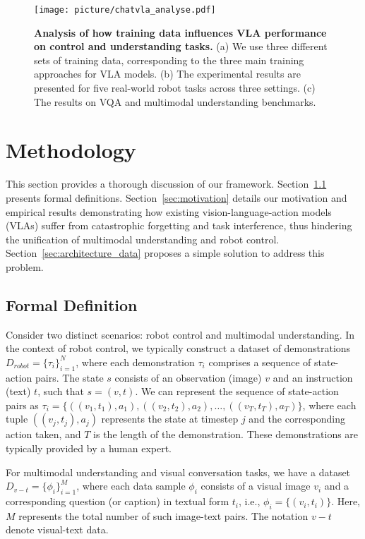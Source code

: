 \begin{figure*}[t]
    \centering
    \texttt{[image: picture/chatvla\_analyse.pdf]}
    \caption{\textbf{Analysis of how training data influences VLA performance on control and understanding tasks.} (a) We use three different sets of training data, corresponding to the three main training approaches for VLA models. (b) The experimental results are presented for five real-world robot tasks across three settings. (c) The results on VQA and multimodal understanding benchmarks.}
    \label{fig:setting}
\end{figure*}


\section{Methodology}

This section provides a thorough discussion of our framework. Section~\ref{sec:definition} presents formal definitions. Section~\ref{sec:motivation} details our motivation and empirical results demonstrating how existing vision-language-action models (VLAs) suffer from catastrophic forgetting and task interference, thus hindering the unification of multimodal understanding and robot control. Section~\ref{sec:architecture_data} proposes a simple solution to address this problem.



\subsection{Formal Definition}\label{sec:definition}
Consider two distinct scenarios: robot control and multimodal understanding. In the context of robot control, we typically construct a dataset of demonstrations $D_{robot} = \{\tau_{i}\}_{i=1}^{N}$, where each demonstration $\tau_{i}$ comprises a sequence of state-action pairs.  The state $s$ consists of an observation (image) $v$ and an instruction (text) $t$, such that $s = (v, t)$.  We can represent the sequence of state-action pairs as $\tau_{i} = \{((v_{1},t_{1}),a_{1}), ((v_{2},t_{2}),a_{2}), \dots, ((v_{T},t_{T}),a_{T})\}$, where each tuple $((v_j, t_j), a_j)$ represents the state at timestep $j$ and the corresponding action taken, and $T$ is the length of the demonstration. These demonstrations are typically provided by a human expert.

For multimodal understanding and visual conversation tasks, we have a dataset $D_{v-t} = \{\phi_{i}\}_{i=1}^{M}$, where each data sample $\phi_{i}$ consists of a visual image $v_i$ and a corresponding question (or caption) in textual form $t_i$, i.e., $\phi_{i} = \{(v_i, t_i)\}$. Here, $M$ represents the total number of such image-text pairs. The notation $v-t$ denote visual-text data.

